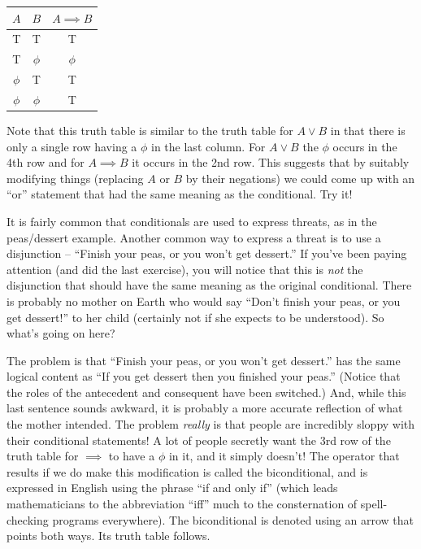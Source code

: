 \begin{center}
\begin{tabular}{c|c||c}
\; $A$ \; & \; $B$ \; & \; $A \implies B$ \; \\ \hline
T & T & T \\
T & $\phi$ & $\phi$\\
 $\phi$ & T & T \\
 $\phi$ &  $\phi$ & T\\
\end{tabular}
\end{center}

\begin{exer} 
Note that this truth table is similar to the truth table for
$A \lor B$ in that there is only a single row having a $\phi$ in
the last column.  For $A \lor B$ the $\phi$ occurs in the 4th row
and for $A \implies B$ it occurs in the 2nd row.  This suggests
that by suitably modifying things (replacing $A$ or $B$ by their
negations) we could come up with an ``or'' statement that had the 
same meaning as the conditional.  Try it!
\end{exer}

It is fairly common that conditionals are used to express threats,
as in the peas/dessert example.  Another common way to express a 
threat is to use a disjunction -- ``Finish your peas, or you won't
get dessert.''  If you've been paying attention (and did the last
exercise), you will notice that this is {\em  not} the disjunction
that should have the same meaning as the original conditional.  
There is probably no mother on Earth who would say
``Don't finish your peas, or you get dessert!'' to her child
(certainly not if she expects to be understood).  So what's going on
here?

The problem is that ``Finish your peas, or you won't
get dessert.'' has the same logical content as
``If you get dessert then you finished your peas.''
(Notice that the roles of the antecedent and consequent have been
switched.)  And, while this last sentence sounds awkward, it is
probably a more accurate reflection of what the mother intended.
The problem {\em really} is that people are incredibly sloppy 
with their conditional statements!  A lot of people secretly want 
the 3rd row of the truth table for $\implies$ to have a $\phi$
in it, and it simply doesn't!  The operator that results if we do
make this modification is called the 
biconditional, and is expressed
in English using the phrase ``if and only if'' (which leads mathematicians
to the abbreviation ``iff'' much to the consternation of 
spell-checking programs everywhere).  The biconditional is denoted 
using an arrow that points both ways.  Its truth table follows.

